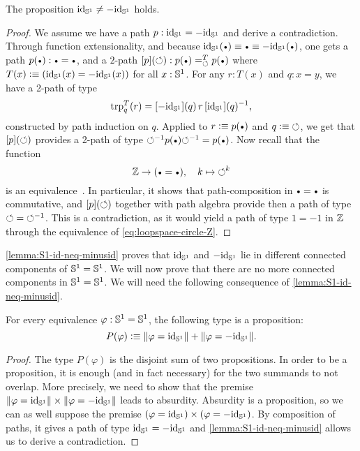 \documentclass[english,a4paper]{lmcs}
\begin{document}
\begin{lem}
  \label{lemma:S1-id-neq-minusid}%
  The proposition $\id_\Sc \neq -\id_\Sc$ holds.
\end{lem}
\begin{proof}
  We assume we have a path $p\from\id_\Sc = -\id_\Sc$ and derive a
  contradiction. Through function extensionality, and because
  $\id_\Sc(\base) \jdeq \base \jdeq -\id_\Sc(\base)$, one gets a path
  $p(\base) \from \base = \base$, and a $2$-path
  $\ap p (\Sloop) \from \pathover {p(\base)} T \Sloop {p(\base)}$ where
  $T(x)\defequi (\id_\Sc(x) = -\id_\Sc(x))$ for all $x:\Sc$.
  For any $r : T(x)$ and $q : x = y$, we have a 2-path of type
  \begin{displaymath}
    \trp [T] q (r) = \ap{-\id_\Sc}(q)\, r \inv{\ap{\id_\Sc}(q)},
  \end{displaymath}
  constructed by path induction on $q$.
  Applied to $r \defequi p(\base)$ and $q \defequi \Sloop$, we get that $\ap p(\Sloop)$ provides a 2-path of type
  $\inv\Sloop p(\base) \inv\Sloop = p(\base)$. Now recall that
  the function
  \begin{equation}
    \label{eq:loopspace-circle-Z}%
    \ZZ\to(\base=\base),\quad k \mapsto \Sloop^k
  \end{equation}
  is an equivalence~\cite{licataShulman_circle}. In particular, it shows that path-composition in
  $\base=\base$ is commutative, and $\ap p (\Sloop)$ together with
  path algebra provide then a path of type $\Sloop = \inv\Sloop$. This
  is a contradiction, as it would yield a path of type $1=-1$ in $\ZZ$
  through the equivalence of \cref{eq:loopspace-circle-Z}.
\end{proof}
\cref{lemma:S1-id-neq-minusid} proves that $\id_\Sc$ and $-\id_\Sc$
lie in different connected components of $\Sc=\Sc$. We will now prove
that there are no more connected components in $\Sc=\Sc$. We will need
the following consequence of \cref{lemma:S1-id-neq-minusid}.
\begin{cor}%
  \label{cor:S1-eq-either-isaprop}%
  For every equivalence $\varphi\from \Sc=\Sc$, the following type is
  a proposition:
  \begin{equation}
    \label{eq:S1-def-target-eq}%
    P(\varphi) \defequi \Trunc{\varphi = \id_\Sc} + \Trunc{\varphi = -\id_\Sc}.
  \end{equation}
\end{cor}
\begin{proof}
  The type $P(\varphi)$ is the disjoint sum of two propositions. In
  order to be a proposition, it is enough (and in fact necessary) for
  the two summands to not overlap. More precisely, we need to show
  that the premise
  $\Trunc{\varphi = \id_\Sc}\times\Trunc{\varphi = -\id_\Sc}$ leads to
  absurdity. Absurdity is a proposition, so we can as well suppose the
  premise ${(\varphi = \id_\Sc)}\times{(\varphi = -\id_\Sc)}$. By
  composition of paths, it gives a path of type $\id_\Sc = -\id_\Sc$
  and \cref{lemma:S1-id-neq-minusid} allows us to derive a
  contradiction.
\end{proof}
\end{document}
